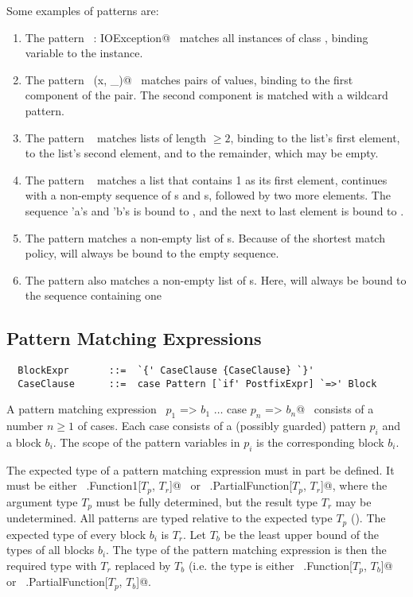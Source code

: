 \documentclass[a4paper,12pt,twoside,titlepage]{book}
\begin{document}
\example Some examples of patterns are:
\begin{enumerate}
\item
The pattern ~\lstinline@ex: IOException@~ matches all instances of class
, binding variable  to the instance.
\item
The pattern ~\lstinline@Pair(x, _)@~ matches pairs of values, binding  to
the first component of the pair. The second component is matched
with a wildcard pattern.
\item
The pattern \  matches lists of length $\geq 2$,
binding  to the list's first element,  to the list's
second element, and  to the remainder, which may be empty.
\item
The pattern \  matches a list that
contains 1 as its first element, continues with a non-empty sequence of 
s and s, followed by two more elements. The sequence 'a's and 'b's
is bound to , and the next to last element is bound to .
\item
The pattern  matches a non-empty list of
s. Because of the shortest match policy,  will always be bound to
the empty sequence.
\item
The pattern  also matches a non-empty list of
s. Here,  will always be bound to
the sequence containing one 
\end{enumerate}

\subsection{Pattern Matching Expressions}
\label{sec:pattern-match}

\syntax\begin{lstlisting}
  BlockExpr       ::=  `{' CaseClause {CaseClause} `}'
  CaseClause      ::=  case Pattern [`if' PostfixExpr] `=>' Block 
\end{lstlisting}

A pattern matching expression
~\lstinline@case $p_1$ => $b_1$ $\ldots$ case $p_n$ => $b_n$@ \ consists of a number 
$n \geq 1$ of cases. Each case consists of a (possibly guarded) pattern 
$p_i$ and a block $b_i$.  The scope of the pattern variables in $p_i$ is 
the corresponding block $b_i$.

The expected type of a pattern matching expression must in part be
defined. It must be either ~\lstinline@scala.Function1[$T_p$, $T_r$]@ \ or
~\lstinline@scala.PartialFunction[$T_p$, $T_r$]@, where the argument type
$T_p$ must be fully determined, but the result type
$T_r$ may be undetermined.  All patterns are typed
relative to the expected type $T_p$ ().  The expected type of
every block $b_i$ is $T_r$.
Let $T_b$ be the least upper bound of the types of all blocks 
$b_i$. The type of the pattern matching expression is
then the required type with $T_r$ replaced by $T_b$
(i.e. the type is either ~\lstinline@scala.Function[$T_p$, $T_b$]@~ or
~\lstinline@scala.PartialFunction[$T_p$, $T_b$]@.
\end{document}
